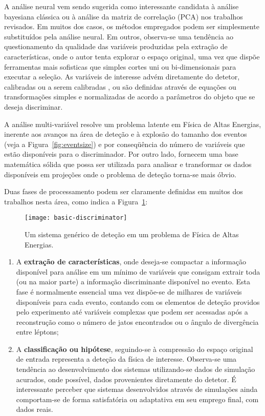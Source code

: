 A análise neural vem sendo sugerida como interessante candidata à análise
bayesiana clássica ou à análise da matriz de correlação (PCA) nos trabalhos
revisados. Em muitos dos casos, os métodos empregados podem ser simplesmente
substituídos pela análise neural. Em outros, observa-se uma tendência ao
questionamento da qualidade das variáveis produzidas pela extração de
características, onde o autor tenta explorar o espaço original, uma vez que
dispõe ferramentas mais sofisticas que simples cortes uni ou bi-dimensionais
para executar a seleção. As variáveis de interesse advém diretamente do
detetor, calibradas ou a serem calibradas \cite{silva-acat-2001}, ou são
definidas através de equações ou transformações simples e normalizadas de
acordo a parâmetros do objeto que se deseja discriminar.

A análise multi-variável resolve um problema latente em Física de Altas
Energias, inerente aos avanços na área de deteção e à explosão do tamanho dos
eventos (veja a Figura~\ref{fig:eventsize}) e por conseqüência do número de
variáveis que estão disponíveis para o discriminador. Por outro lado, fornecem
uma base matemática sólida que possa ser utilizada para analisar e transformar
os dados disponíveis em projeções onde o problema de deteção torna-se mais
óbvio.

Duas fases de processamento podem ser claramente definidas em muitos dos
trabalhos nesta área, como indica a Figura~\ref{fig:basic-discriminator}:

\begin{figure}
\begin{center}
\texttt{[image: basic-discriminator]}
\end{center}
\caption{Um sistema genérico de deteção em um problema de Física de Altas Energias.}
\label{fig:basic-discriminator}
\end{figure}

\begin{enumerate}
\item A \textbf{extração de características}, onde deseja-se compactar a
informação disponível para análise em um mínimo de variáveis que consigam
extrair toda (ou na maior parte) a informação discriminante disponível no
evento. Esta fase é normalmente essencial uma vez dispõe-se de milhares de
variáveis disponíveis para cada evento, contando com os elementos de deteção
providos pelo experimento até variáveis complexas que podem ser acessadas após
a reconstrução como o número de jatos encontrados ou o ângulo de divergência
entre léptons;
\item A \textbf{classificação ou hipótese}, seguindo-se à compressão do espaço
original de entrada representa a deteção da física de interesse. Observa-se uma
tendência ao desenvolvimento dos sistemas utilizando-se dados de simulação
acurados, onde possível, dados provenientes diretamente do detetor. É
interessante perceber que sistemas desenvolvidos através de simulações ainda
comportam-se de forma satisfatória ou adaptativa em seu emprego final, com
dados reais.
\end{enumerate}

